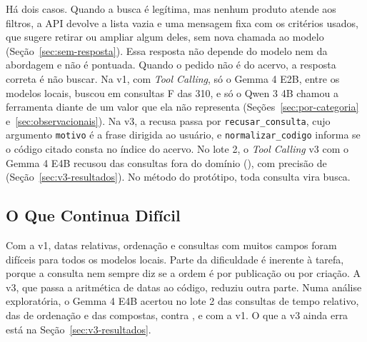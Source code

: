 Há dois casos. Quando a busca é legítima, mas nenhum produto atende aos filtros, a API devolve a lista vazia e uma mensagem fixa com os critérios usados, que sugere retirar ou ampliar algum deles, sem nova chamada ao modelo (Seção~\ref{sec:sem-resposta}). Essa resposta não depende do modelo nem da abordagem e não é pontuada. Quando o pedido não é do acervo, a resposta correta é não buscar. Na v1, com \textit{Tool Calling}, só o Gemma 4 E2B, entre os modelos locais, buscou em consultas F das 310, e só o Qwen 3 4B chamou a ferramenta diante de um valor que ela não representa (Seções~\ref{sec:por-categoria} e~\ref{sec:observacionais}). Na v3, a recusa passa por \texttt{recusar\_consulta}, cujo argumento \texttt{motivo} é a frase dirigida ao usuário, e \texttt{normalizar\_codigo} informa se o código citado consta no índice do acervo. No lote 2, o \textit{Tool Calling} v3 com o Gemma 4 E4B recusou  das consultas fora do domínio (), com precisão de  (Seção~\ref{sec:v3-resultados}). No método do protótipo, toda consulta vira busca.

\subsection{O Que Continua Difícil}
\label{sec:dificil}

Com a v1, datas relativas, ordenação e consultas com muitos campos foram difíceis para todos os modelos locais. Parte da dificuldade é inerente à tarefa, porque a consulta nem sempre diz se a ordem é por publicação ou por criação. A v3, que passa a aritmética de datas ao código, reduziu outra parte. Numa análise exploratória, o Gemma 4 E4B acertou no lote 2  das consultas de tempo relativo,  das de ordenação e  das compostas, contra ,  e  com a v1. O que a v3 ainda erra está na Seção~\ref{sec:v3-resultados}.
